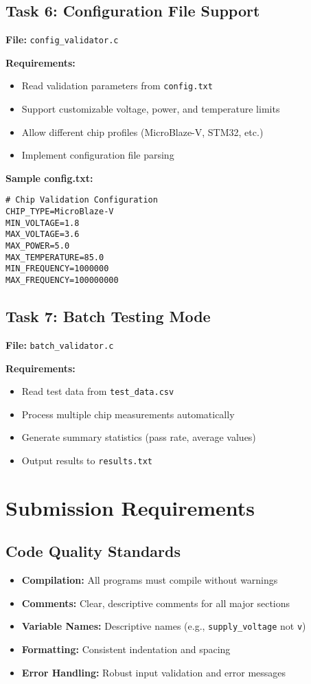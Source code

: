 \documentclass[11pt,a4paper]{article}
\begin{document}
\subsection{Task 6: Configuration File Support}

\textbf{File:} \texttt{config\_validator.c}

\textbf{Requirements:}
\begin{itemize}
    \item Read validation parameters from \texttt{config.txt}
    \item Support customizable voltage, power, and temperature limits
    \item Allow different chip profiles (MicroBlaze-V, STM32, etc.)
    \item Implement configuration file parsing
\end{itemize}

\textbf{Sample config.txt:}
\begin{verbatim}
# Chip Validation Configuration
CHIP_TYPE=MicroBlaze-V
MIN_VOLTAGE=1.8
MAX_VOLTAGE=3.6
MAX_POWER=5.0
MAX_TEMPERATURE=85.0
MIN_FREQUENCY=1000000
MAX_FREQUENCY=100000000
\end{verbatim}

\subsection{Task 7: Batch Testing Mode}

\textbf{File:} \texttt{batch\_validator.c}

\textbf{Requirements:}
\begin{itemize}
    \item Read test data from \texttt{test\_data.csv}
    \item Process multiple chip measurements automatically
    \item Generate summary statistics (pass rate, average values)
    \item Output results to \texttt{results.txt}
\end{itemize}

\section{Submission Requirements}

\subsection{Code Quality Standards}
\begin{itemize}
    \item \textbf{Compilation:} All programs must compile without warnings
    \item \textbf{Comments:} Clear, descriptive comments for all major sections
    \item \textbf{Variable Names:} Descriptive names (e.g., \texttt{supply\_voltage} not \texttt{v})
    \item \textbf{Formatting:} Consistent indentation and spacing
    \item \textbf{Error Handling:} Robust input validation and error messages
\end{itemize}
\end{document}
